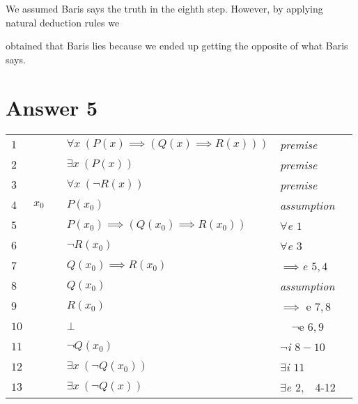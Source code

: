 \documentclass[12pt]{article}
\begin{document}
\centerline{We assumed Baris says the truth in the eighth step. However, by applying natural deduction rules we}
\centerline{obtained that Baris lies because we ended up getting the opposite of what Baris says.}

\section*{Answer 5}


\begin{table}[H]
	\centering
    
	\begin{tabular}{*6{l}}
		$1$ & & & $\forall x \ (P(x) \implies (Q(x) \implies R(x)))$ & \textit{premise} \\
		
		$2$ & & & $\exists x \ (P(x))$ & \textit{premise} \\
		
		$3$ & & & $\forall x \ (\neg R(x))$ & \textit{premise} \\ \cline{2-6}
		
		$4$ &\multicolumn{1}{|c}{$x_0$} & & $P(x_0)$ &\textit{assumption} &\multicolumn{1}{c|}{}\\ 
		
		$5$ &\multicolumn{1}{|c}{} & & $P(x_0) \implies (Q(x_0) \implies R(x_0))$ &\textit{$\forall $e $1$} &\multicolumn{1}{c|}{}\\ %
		
		$6$ &\multicolumn{1}{|c}{} & & $\neg R(x_0)$ &\textit{$\forall $e $3$} &\multicolumn{1}{c|}{} \\
		
		$7$ &\multicolumn{1}{|c}{} & & $Q(x_0) \implies R(x_0)$ &\textit{$\implies $e $5,4$} &\multicolumn{1}{c|}{} \\ \cline{3-5}
		
		$8$ &\multicolumn{1}{|c}{}&\multicolumn{1}{|c}{$$}& $Q(x_0)$ &\multicolumn{1}{l|}{\textit{assumption}}&\multicolumn{1}{c|}{} \\ 
		
		$9$ &\multicolumn{1}{|c}{}&\multicolumn{1}{|c}{}& $R(x_0)$ &\multicolumn{1}{l|}{$\implies$ e $7,8$}	&\multicolumn{1}{c|}{} \\
		
		$10$ &\multicolumn{1}{|c}{}&\multicolumn{1}{|c}{}& $\bot$ & \multicolumn{1}{c|}{$\neg$e $6,9$} &\multicolumn{1}{c|}{} \\  \cline{3-5}
		
		$11$ &\multicolumn{1}{|c}{} & & $\neg Q(x_0)$ &\textit{$\neg$i $8-10$} &\multicolumn{1}{c|}{} \\ 
		
		$12$ &\multicolumn{1}{|c}{} & & $\exists x \ (\neg Q(x_0))$ &\textit{$\exists$i $11$} &\multicolumn{1}{c|}{} \\ \cline{2-6}

		$13$ & & & $\exists x \ (\neg Q(x))$ & \textit{$\exists$e $ 2,$} \ 4-12 \\

	
	\end{tabular}
\end{table}
\end{document}

